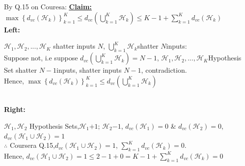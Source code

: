\documentclass[a4paper,12pt]{article}
\begin{document}
\section {}
By Q.15 on Couresa: \underline{\underline{\textbf{Claim:}}} $\max \left \{   d_{vc} (\mathcal{H}_{k})   \right \}_{k=1}^{K} \leq d_{vc}(\displaystyle \bigcup_{k=1}^{K}\mathcal{H}_{k} ) \leq K-1+ \displaystyle \sum_{k=1}^{K} d_{vc}(\mathcal{H}_{k})$ \\
\textbf{Left:}
\begin{minipage}[t]{0.9\linewidth}
{\McQ{}}$\mathcal{H}_{1}, \mathcal{H}_{2},...,\mathcal{H}_{K}$ {\MbQ{}}shatter {\MbQ{}}inputs {\MaQ{}}$N$, {\MaQ{}}$\displaystyle \bigcup_{k=1}^{K} \mathcal{H}_{k}${\MaQ{}}shatter $N${\MaQ{}}inputs:\\
Suppose not, i.e suppose $d_{vc}(\displaystyle \bigcup_{k=1}^{K} \mathcal{H}_{k})=N-1$, {\McQ{}}$\mathcal{H}_{1}, \mathcal{H}_{2},...,\mathcal{H}_{K}${\McQ{}}Hypothesis Set {\MbQ{}}shatter  $N-1${\MaQ{}}inputs, {\MaQ{}}shatter {\MbQ{}}inputs {\MaQ{}}$N-1${\MaQ{}}, contradiction.\\
Hence, $\max \left \{   d_{vc} (\mathcal{H}_{k})   \right \}_{k=1}^{K} \leq d_{vc}(\displaystyle \bigcup_{k=1}^{K}\mathcal{H}_{k} )$
\end{minipage}
\\
\textbf{Right:}
\begin{minipage}[t]{0.9\linewidth}
{\MaQ{}} $\mathcal{H}_{1}, \mathcal{H}_{2}$ {\McQ{}}Hypothesis Sets,$\mathcal{H}_{1}${\MbQ{}}$+1$; $\mathcal{H}_{2}${\MbQ{}}$-1$, {\MaQ{}}$d_{vc}(\mathcal{H}_{1})=0$ \& $d_{vc}(\mathcal{H}_{2})=0$,$d_{vc}(\mathcal{H}_{1} \cup \mathcal{H}_{2})=1${\MaQ{}}\\
$\therefore$ {\MbQ{}}Coursera Q.15,$d_{vc}(\mathcal{H}_{1} \cup \mathcal{H}_{2})=1$, $\displaystyle \sum_{k=1}^{K} d_{vc}(\mathcal{H}_{k})=0$.\\
Hence, $d_{vc}(\mathcal{H}_{1} \cup \mathcal{H}_{2})=1 \leq 2-1+0= K-1+\displaystyle \sum_{k=1}^{K} d_{vc}(\mathcal{H}_{k})=0${\MbQ{}}\zZ
\end{minipage}
\end{document}
